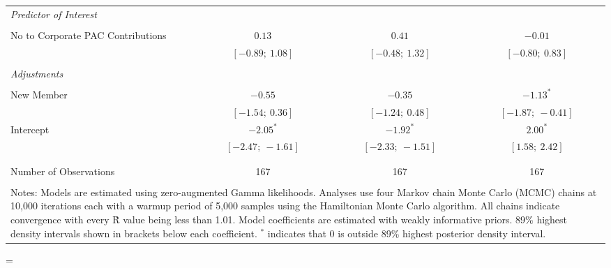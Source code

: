 \begin{table}[!htb]
\begin{center}
{{\begin{tabular}{@{\extracolsep{10pt}}lccc}
\\[-1.8ex] \textit{Predictor of Interest} \\ \\[-1.8ex]
\quad No to Corporate PAC Contributions     & $0.13$                  & $0.41$                  & $-0.01$               \\
          & $[-0.89;\ 1.08]$        & $[-0.48;\ 1.32]$        & $[-0.80;\ 0.83]$      \\
\\[-1.8ex] \textit{Adjustments} \\ \\[-1.8ex]
	\quad New Member     & $-0.55$                 & $-0.35$                 & $-1.13^{*}$           \\
          & $[-1.54;\ 0.36]$        & $[-1.24;\ 0.48]$        & $[-1.87;\ -0.41]$     \\
\quad Intercept         & $-2.05^{*}$             & $-1.92^{*}$             & $2.00^{*}$            \\
          & $[-2.47;\ -1.61]$       & $[-2.33;\ -1.51]$       & $[1.58;\ 2.42]$       \\
          \\
 \midrule  \\[-1.8ex]
Number of Observations & 167 & 167 & 167 \\
\bottomrule  \\[-1.8ex]
\multicolumn{4}{p{\linewidth}}{Notes: Models are estimated using zero-augmented Gamma likelihoods. Analyses use four Markov chain Monte Carlo (MCMC) chains at 10,000 iterations each with a warmup period of 5,000 samples using the Hamiltonian Monte Carlo algorithm. All chains indicate convergence with every \^{R} value being less than 1.01. Model coefficients are estimated with weakly informative priors. 89\% highest density intervals shown in brackets below each coefficient. $^*$ indicates that 0 is outside 89\% highest posterior density interval.}
\end{tabular}}
=\hbox{\contents}
	\setlength{\linewidth}{\wd0-2\tabcolsep-.25em}
	\contents
}
\end{center}
\end{table}
